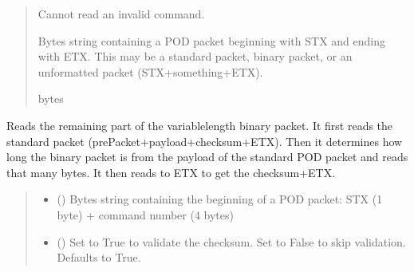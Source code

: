 \documentclass[letterpaper,10pt,english]{sphinxmanual}
\begin{document}
\begin{fulllineitems}
\begin{fulllineitems}
\begin{quote}
\begin{description}
\sphinxAtStartPar
{} \textendash{} Cannot read an invalid command.

\sphinxAtStartPar
Bytes string containing a POD packet beginning with STX and ending with ETX. This may                 be a standard packet, binary packet, or an unformatted packet (STX+something+ETX).

\sphinxAtStartPar
bytes

\end{description}\end{quote}

\end{fulllineitems}


\begin{fulllineitems}
\label{\detokenize{BasicPodProtocol:BasicPodProtocol.POD_Basics._Read_Binary}}
\pysigstartsignatures
{}
\pysigstopsignatures
\sphinxAtStartPar
Reads the remaining part of the variable\sphinxhyphen{}length binary packet. It first reads the standard         packet (prePacket+payload+checksum+ETX). Then it determines how long the binary packet is from the         payload of the standard POD packet and reads that many bytes. It then reads to ETX to get the         checksum+ETX.
\begin{quote}\begin{description}
\begin{itemize}
\item {} 
\sphinxAtStartPar
{} () \textendash{} Bytes string containing the beginning of a POD packet: STX (1 byte)                 + command number (4 bytes)

\item {} 
\sphinxAtStartPar
{} (\sphinxstyleliteralemphasis{\sphinxupquote{, }}) \textendash{} Set to True to validate the checksum. Set to False to                 skip validation. Defaults to True.


\end{itemize}
\end{description}
\end{quote}
\end{fulllineitems}
\end{fulllineitems}
\end{document}
